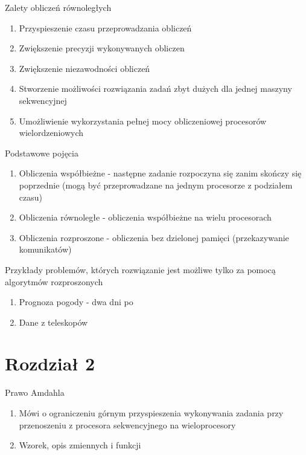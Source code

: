 \documentclass{beamer}
\begin{document}
\begin{frame}{Zalety obliczeń równoległych}
  \begin{enumerate}
  \item Przyspieszenie czasu przeprowadzania obliczeń
  \item Zwiększenie precyzji wykonywanych obliczen
  \item Zwiększenie niezawodności obliczeń
  \item Stworzenie możliwości rozwiązania zadań zbyt dużych dla jednej maszyny sekwencyjnej
  \item Umożliwienie wykorzystania pełnej mocy obliczeniowej procesorów wielordzeniowych
  \end{enumerate}
\end{frame}

\begin{frame}{Podstawowe pojęcia}
  \begin{enumerate}
  \item Obliczenia współbieżne - następne zadanie rozpoczyna się zanim skończy się poprzednie (mogą być przeprowadzane na jednym procesorze z podziałem czasu)
  \item Obliczenia równoległe - obliczenia współbieżne na wielu procesorach
  \item Obliczenia rozproszone - obliczenia bez dzielonej pamięci (przekazywanie komunikatów)
  \end{enumerate}
\end{frame}

\begin{frame}{Przykłady problemów, których rozwiązanie jest możliwe tylko za pomocą algorytmów rozproszonych}
  \begin{enumerate}
  \item Prognoza pogody - dwa dni po
  \item Dane z teleskopów
  \end{enumerate}
\end{frame}

\section{Rozdział 2}

\begin{frame}{Prawo Amdahla}
  \begin{enumerate}
  \item Mówi o ograniczeniu górnym przyspieszenia wykonywania zadania przy przenoszeniu z procesora sekwencyjnego na wieloprocesory
  \item Wzorek, opis zmiennych i funkcji
  \end{enumerate}
\end{frame}
\end{document}
